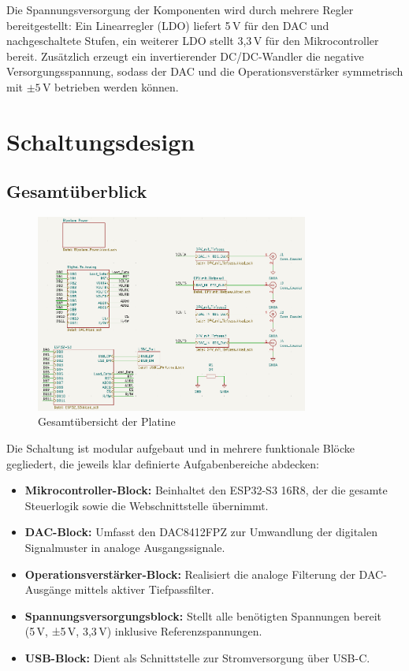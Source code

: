 Die Spannungsversorgung der Komponenten wird durch mehrere Regler bereitgestellt: Ein Linearregler (LDO) liefert 5\,V für den DAC und nachgeschaltete Stufen, ein weiterer LDO stellt 3{,}3\,V für den Mikrocontroller bereit. Zusätzlich erzeugt ein invertierender DC/DC-Wandler die negative Versorgungsspannung, sodass der DAC und die Operationsverstärker symmetrisch mit \(\pm5\,\text{V}\) betrieben werden können.

\clearpage

\section{Schaltungsdesign}
\subsection{Gesamtüberblick}
\begin{figure}[H]
    \centering
    \includegraphics[width=0.8\textwidth]{bilder/Platine_gesamt.png}
    \caption{Gesamtübersicht der Platine}
    \label{fig:gesamtuebersicht}
\end{figure}
Die Schaltung ist modular aufgebaut und in mehrere funktionale Blöcke gegliedert, die jeweils klar definierte Aufgabenbereiche abdecken:

\begin{itemize}
    \item \textbf{Mikrocontroller-Block:} Beinhaltet den ESP32-S3 16R8, der die gesamte Steuerlogik sowie die Webschnittstelle übernimmt.
    \item \textbf{DAC-Block:} Umfasst den DAC8412FPZ zur Umwandlung der digitalen Signalmuster in analoge Ausgangssignale.
    \item \textbf{Operationsverstärker-Block:} Realisiert die analoge Filterung der DAC-Ausgänge mittels aktiver Tiefpassfilter.
    \item \textbf{Spannungsversorgungsblock:} Stellt alle benötigten Spannungen bereit (5 V, ±5 V, 3{,}3 V) inklusive Referenzspannungen.
    \item \textbf{USB-Block:} Dient als Schnittstelle zur Stromversorgung über USB-C.
\end{itemize}




